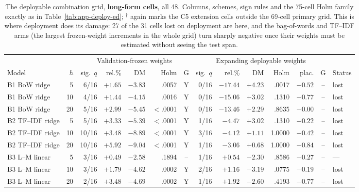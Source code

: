 \begin{table}[p]
\centering
\caption[The deployable combiner, long-form cells]{The deployable
combination grid, \textbf{long-form cells}, all 48. Columns, schemes, sign
rules and the 75-cell Holm family exactly as in
Table~\ref{tab:app-deploy-ed}; $^{\dagger}$ again marks the C5 extension
cells outside the 69-cell primary grid. This is where deployment does its
damage: 27 of the 31 cells lost on deployment are here, and the
bag-of-words and TF--IDF arms (the largest frozen-weight increments in
the whole grid) turn sharply negative once their weights must be
estimated without seeing the test span.}
\label{tab:app-deploy-lf}
\singlespacing\footnotesize
\setlength{\tabcolsep}{3pt}
\setlength{\defaultaddspace}{0.25em}
\begin{tabular}{@{}lrrrrrcrrrrrcl@{}}
\toprule
& & \multicolumn{5}{c}{Validation-frozen weights} & \multicolumn{6}{c}{Expanding deployable weights} & \\
\cmidrule(lr){3-7}\cmidrule(lr){8-13}
Model & $h$ & sig.\ $q$ & rel.\% & DM & Holm & G & sig.\ $q$ & rel.\% & DM & Holm & plac. & G & Status \\
\midrule
B1 BoW ridge&5&6/16&$+1.65$&$-3.83$& .0057 &Y&0/16&$-17.44$&$+4.23$& .0017 &$-0.52$&--&lost\\
B1 BoW ridge&10&4/16&$+1.44$&$-4.15$& .0016 &Y&0/16&$-15.06$&$+3.02$& .1310 &$+0.77$&--&lost\\
B1 BoW ridge&20&5/16&$+2.99$&$-5.45$& $<$.0001 &Y&0/16&$-13.46$&$+2.29$& .8635 &$-0.00$&--&lost\\
\addlinespace
B2 TF--IDF ridge&5&5/16&$+3.33$&$-5.39$& $<$.0001 &Y&1/16&$-4.47$&$+3.02$& .1310 &$-0.22$&--&lost\\
B2 TF--IDF ridge&10&10/16&$+3.48$&$-8.89$& $<$.0001 &Y&3/16&$-4.12$&$+1.11$& 1.0000 &$+0.42$&--&lost\\
B2 TF--IDF ridge&20&10/16&$+5.92$&$-9.04$& $<$.0001 &Y&1/16&$-3.06$&$+0.68$& 1.0000 &$-0.84$&--&lost\\
\addlinespace
B3 L--M linear&5&3/16&$+0.49$&$-2.58$& .1894 &--&1/16&$+0.54$&$-2.30$& .8586 &$-0.27$&--&---\\
B3 L--M linear&10&3/16&$+1.79$&$-4.62$& .0002 &Y&2/16&$+1.16$&$-3.19$& .0775 &$+0.19$&--&lost\\
B3 L--M linear&20&2/16&$+3.48$&$-4.69$& .0002 &Y&1/16&$+1.92$&$-2.60$& .4193 &$-0.77$&--&lost\\

\end{tabular}
\end{table}
